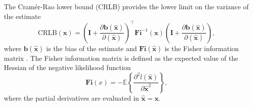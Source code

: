The Cram\'er-Rao lower bound (CRLB) provides the lower limit on the variance of the estimate
\begin{equation} \mathrm{CRLB}(\mathbf{x}) = \left( \mathbf{I} + \frac{\partial \mathbf{b} (\widehat{\mathbf{x}}) }{\partial (\widehat{\mathbf{x}})} \right)^\top \mathbf{Fi}^{-1}(\mathbf{x}) \left( \mathbf{I} + \frac{\partial \mathbf{b} (\widehat{\mathbf{x}}) }{\partial (\widehat{\mathbf{x}})} \right), \label{eqn:CRLB} \end{equation}
where $\mathbf{b} (\widehat{\mathbf{x}})$ is the bias of the estimate and $\mathbf{Fi}(\widehat{\mathbf{x}})$ is the Fisher information matrix \citep{Pintelon12Book}.
The Fisher information matrix is defined as the expected value of the Hessian of the negative likelihood function 
\begin{equation} \mathbf{Fi}(x) = - \mathbb{E} \left\{ \frac{\partial ^2 l (\widehat{\mathbf{x}}) }{\partial \widehat{\mathbf{x}}^2 } \right\}, \end{equation}
where the partial derivatives are evaluated in $\widehat{\mathbf{x}} = \mathbf{x}$.

